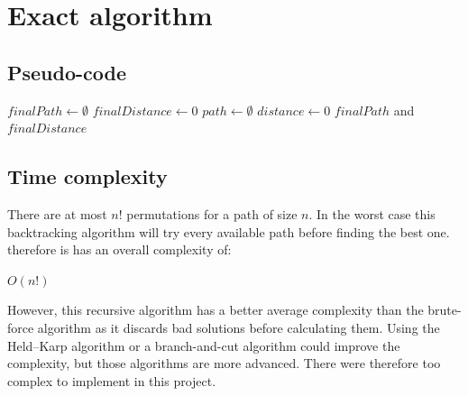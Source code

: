\documentclass[a4paper, 12pt]{report}
\begin{document}
	
	\chapter{Exact algorithm}
		\section{Pseudo-code}
			\begin{algorithm}
				\DontPrintSemicolon
				\BlankLine
				$finalPath \leftarrow \emptyset$\;
				$finalDistance \leftarrow 0$\;
				\BlankLine
				$path \leftarrow \emptyset$\;
				$distance \leftarrow 0$\;
				\BlankLine
				\BlankLine
				\Return $finalPath$ and $finalDistance$\;
			\end{algorithm}
		
		\section{Time complexity}
		There are at most $n!$ permutations for a path of size $n$. In the worst case this backtracking algorithm will try every available path before finding the best one. 
		therefore is has an overall complexity of:
		\begin{center}
			$O(n!)$
		\end{center}
		However, this recursive algorithm has a better average complexity than the brute-force algorithm as it discards bad solutions before calculating them. Using the Held–Karp algorithm or a branch-and-cut algorithm could improve the complexity, but those algorithms are more advanced. There were therefore too complex to implement in this project.
\end{document}
